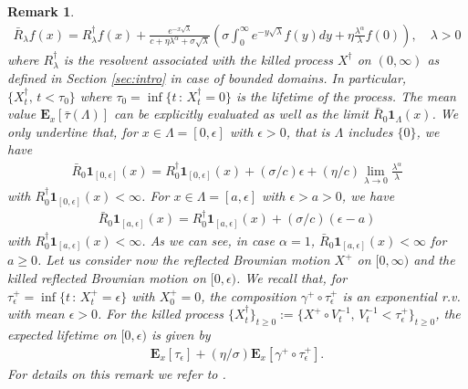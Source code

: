 \documentclass[11pt,a4paper]{article}
\newtheorem{remark}{Remark}[section]
\begin{document}
\begin{remark}
\begin{align*}
\bar{R}_\lambda f(x) =  R^\dagger_\lambda f(x) + \frac{e^{-x \sqrt{\lambda}}}{c + \eta \lambda^\alpha + \sigma \sqrt{\lambda}} \left( \sigma \int_0^\infty e^{-y \sqrt{\lambda}} f(y) dy + \eta \frac{\lambda^\alpha}{\lambda}  f(0) \right), \quad \lambda>0
\end{align*}
where $R^\dagger_\lambda$ is the resolvent associated with the killed process $X^\dagger$ on $(0, \infty)$ as defined in Section \ref{sec:intro} in case of bounded domains. In particular, $\{X^\dagger_t,\, t < \tau_0\}$ where $\tau_0 = \inf\{t\,:\, X^\dagger_t=0\}$ is the lifetime of the process. The mean value $\mathbf{E}_x[\bar{\tau}(\Lambda)]$ can be explicitly evaluated as well as the limit $\bar{R}_0 \mathbf{1}_\Lambda (x)$. We only underline that, for $x \in \Lambda =[0, \epsilon]$ with $\epsilon>0$, that is $\Lambda$ includes $\{0\}$, we have 
\begin{align*}
\bar{R}_0 \mathbf{1}_{[0,\epsilon]}(x) = R^\dagger_0 \mathbf{1}_{[0, \epsilon]}(x)  + (\sigma/c) \epsilon + (\eta/c) \lim_{\lambda \to 0} \frac{\lambda^\alpha}{\lambda}
\end{align*}
with $R^\dagger_0 \mathbf{1}_{[0, \epsilon]}(x) < \infty$. For $x \in \Lambda =[a, \epsilon]$ with $\epsilon > a >0$, we have
\begin{align*}
\bar{R}_0 \mathbf{1}_{[a,\epsilon]}(x) = R^\dagger_0 \mathbf{1}_{[a, \epsilon]}(x)  + (\sigma/c) (\epsilon - a)
\end{align*}
with $R^\dagger_0 \mathbf{1}_{[a, \epsilon]}(x) < \infty$. As we can see, in case $\alpha=1$, $\bar{R}_0 \mathbf{1}_{[a,\epsilon]}(x) < \infty$ for $a\geq 0$. Let us consider now the reflected Brownian motion $X^+$ on $[0, \infty)$ and the killed reflected Brownian motion on $[0, \epsilon)$. We recall that, for $\tau^+_\epsilon = \inf\{t\,:\, X^+_t = \epsilon\}$ with $X^+_0=0$, the composition $\gamma^+ \circ \tau^+_\epsilon$ is an exponential r.v. with mean $\epsilon >0$. For the killed process $\{X^\dagger_t\}_{t\geq 0} := \{X^+ \circ V^{-1}_t,\, V^{-1}_t < \tau^+_\epsilon \}_{t \geq 0}$, the expected lifetime on $[0, \epsilon)$ is given by
\begin{align*}
\mathbf{E}_x[\tau_\epsilon] + (\eta/\sigma) \mathbf{E}_x[\gamma^+ \circ \tau^+_\epsilon].
\end{align*}
For details on this remark we refer to \cite{NLBVP-ItheHline}.
\end{remark}
\end{document}

